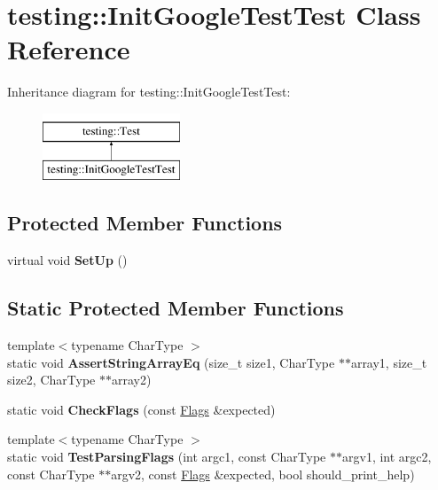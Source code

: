 \hypertarget{classtesting_1_1_init_google_test_test}{}\section{testing\+:\+:Init\+Google\+Test\+Test Class Reference}
\label{classtesting_1_1_init_google_test_test}
Inheritance diagram for testing\+:\+:Init\+Google\+Test\+Test\+:\begin{figure}[H]
\begin{center}
\leavevmode
\includegraphics[height=2.000000cm]{classtesting_1_1_init_google_test_test}
\end{center}
\end{figure}
\subsection*{Protected Member Functions}
\begin{DoxyCompactItemize}
\item 
\mbox{\label{classtesting_1_1_init_google_test_test_a49de9e552ea788c4b79924ec4135ca7a}} 
virtual void {\bfseries Set\+Up} ()
\end{DoxyCompactItemize}
\subsection*{Static Protected Member Functions}
\begin{DoxyCompactItemize}
\item 
\mbox{\label{classtesting_1_1_init_google_test_test_af32acd91b1185c6868072009dce55a7b}} 
{\footnotesize template$<$typename Char\+Type $>$ }\\static void {\bfseries Assert\+String\+Array\+Eq} (size\+\_\+t size1, Char\+Type $\ast$$\ast$array1, size\+\_\+t size2, Char\+Type $\ast$$\ast$array2)
\item 
\mbox{\label{classtesting_1_1_init_google_test_test_aac37d5d592202bf6614b02fe0b4da9d2}} 
static void {\bfseries Check\+Flags} (const \mbox{\hyperlink{structtesting_1_1_flags}{Flags}} \&expected)
\item 
\mbox{\label{classtesting_1_1_init_google_test_test_add290338cf429308d0ab275ae4c46e69}} 
{\footnotesize template$<$typename Char\+Type $>$ }\\static void {\bfseries Test\+Parsing\+Flags} (int argc1, const Char\+Type $\ast$$\ast$argv1, int argc2, const Char\+Type $\ast$$\ast$argv2, const \mbox{\hyperlink{structtesting_1_1_flags}{Flags}} \&expected, bool should\+\_\+print\+\_\+help)
\end{DoxyCompactItemize}
